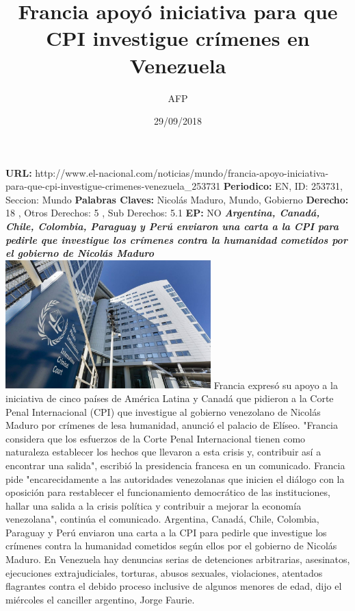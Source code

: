 \documentclass{article}%
\title{\textbf{Francia apoyó iniciativa para que CPI investigue crímenes en Venezuela}}%
\author{AFP}%
\date{29/09/2018}%
\begin{document}
%
\normalsize%
\maketitle%
\textbf{URL: }%
http://www.el{-}nacional.com/noticias/mundo/francia{-}apoyo{-}iniciativa{-}para{-}que{-}cpi{-}investigue{-}crimenes{-}venezuela\_253731\newline%
%
\textbf{Periodico: }%
EN, %
ID: %
253731, %
Seccion: %
Mundo\newline%
%
\textbf{Palabras Claves: }%
Nicolás Maduro, Mundo, Gobierno\newline%
%
\textbf{Derecho: }%
18%
, Otros Derechos: %
5%
, Sub Derechos: %
5.1%
\newline%
%
\textbf{EP: }%
NO\newline%
\newline%
%
\textbf{\textit{Argentina, Canadá, Chile, Colombia, Paraguay y Perú enviaron una carta a la CPI para pedirle que investigue los crímenes contra la humanidad cometidos por el gobierno de Nicolás Maduro}}%
\newline%
\newline%
%
\includegraphics[width=300px]{212.jpg}%
\newline%
%
Francia expresó su apoyo a la iniciativa de cinco países de América Latina y Canadá que pidieron a la Corte Penal Internacional (CPI) que investigue al gobierno venezolano de Nicolás Maduro por crímenes de lesa humanidad, anunció el palacio de Elíseo.%
\newline%
%
"Francia considera que los esfuerzos de la Corte Penal Internacional tienen como naturaleza establecer los hechos que llevaron a esta crisis y, contribuir así a encontrar una salida", escribió la presidencia francesa en un comunicado.%
\newline%
%
Francia pide "encarecidamente a las autoridades venezolanas que inicien el diálogo con la oposición para restablecer el funcionamiento democrático de las instituciones, hallar una salida a la crisis política y contribuir a mejorar la economía venezolana", continúa el comunicado.%
\newline%
%
Argentina, Canadá, Chile, Colombia, Paraguay y Perú enviaron una carta a la CPI para pedirle que investigue los crímenes contra la humanidad cometidos según ellos por el gobierno de Nicolás Maduro.%
\newline%
%
En Venezuela hay denuncias serias de detenciones arbitrarias, asesinatos, ejecuciones extrajudiciales, torturas, abusos sexuales, violaciones, atentados flagrantes contra el debido proceso inclusive de algunos menores de edad, dijo el miércoles el canciller argentino, Jorge Faurie.%
\newline%
%
\end{document}
